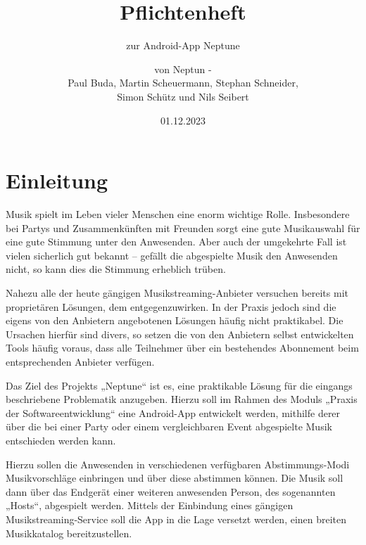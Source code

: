 \documentclass[oneside, ngerman]{sdqtechreport}
\author{von Neptun - \\
Paul Buda, Martin Scheuermann, Stephan Schneider, \\
Simon Schütz und Nils Seibert}
\title{Pflichtenheft}
\subtitle{zur Android-App Neptune}
\date{01.12.2023}
\begin{document}
\setpdf

\maketitle

\tableofcontents

\cleardoublepage


\chapter{Einleitung}
\textbf{}Musik spielt im Leben vieler Menschen eine enorm wichtige Rolle. Insbesondere bei Partys und Zusammenkünften mit Freunden sorgt eine gute Musikauswahl für eine gute Stimmung unter den Anwesenden. Aber auch der umgekehrte Fall ist vielen sicherlich gut bekannt – gefällt die abgespielte Musik den Anwesenden nicht, so kann dies die Stimmung erheblich trüben.

Nahezu alle der heute gängigen Musikstreaming-Anbieter versuchen bereits mit proprietären Lösungen, dem entgegenzuwirken. In der Praxis jedoch sind die eigens von den Anbietern angebotenen Lösungen häufig nicht praktikabel. Die Ursachen hierfür sind divers, so setzen die von den Anbietern selbst entwickelten Tools häufig voraus, dass alle Teilnehmer über ein bestehendes Abonnement beim entsprechenden Anbieter verfügen. 

Das Ziel des Projekts „Neptune“ ist es, eine praktikable Lösung für die eingangs beschriebene Problematik anzugeben. Hierzu soll im Rahmen des Moduls „Praxis der Softwareentwicklung“ eine Android-App entwickelt werden, mithilfe derer über die bei einer Party oder einem vergleichbaren Event abgespielte Musik entschieden werden kann.

Hierzu sollen die Anwesenden in verschiedenen verfügbaren Abstimmungs-Modi Musikvorschläge einbringen und über diese abstimmen können. Die Musik soll dann über das Endgerät einer weiteren anwesenden Person, des sogenannten „Hosts“, abgespielt werden. 
Mittels der Einbindung eines gängigen Musikstreaming-Service soll die App in die Lage versetzt werden, einen breiten Musikkatalog bereitzustellen.  

\label{chap:Einleitung}
\end{document}
